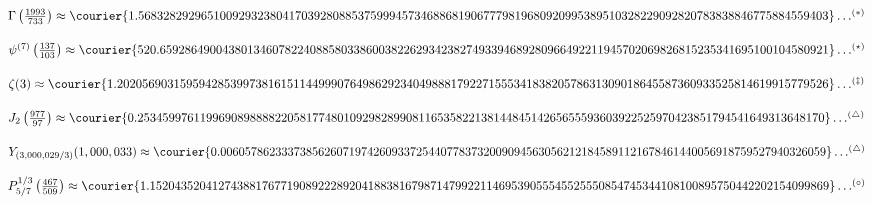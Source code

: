 \begin{flushleft}
\vspace{7.0pt} $\Gamma \left ( \frac{1993}{733} \right ) \approx
\mbox{\courier{1.56832829296510092932380417039280885375999457346886819067779819680920995389510328229092820783838846775884559403}}\dots^{\left ( \ast \right )}$

\vspace{7.0pt} $\psi^{(7)} \left ( \frac{137}{103} \right ) \approx
\mbox{\courier{520.65928649004380134607822408858033860038226293423827493394689280966492211945702069826815235341695100104580921}}\dots^{\left ( \star \right )}$

\vspace{7.0pt} $\zeta(3) \approx
\mbox{\courier{1.20205690315959428539973816151144999076498629234049888179227155534183820578631309018645587360933525814619915779526}}\dots^{\left ( \ddag \right )}$

\vspace{7.0pt} $J_{2} \left ( \frac{977}{97} \right ) \approx
\mbox{\courier{0.25345997611996908988882205817748010929828990811653582213814484514265655593603922525970423851794541649313648170}}\dots^{\left ( \triangle \right )}$

\vspace{7.0pt} $Y_{(3,000,029/3)} (1,000,033) \approx
\mbox{\courier{0.006057862333738562607197426093372544077837320090945630562121845891121678461440056918759527940326059}}\dots^{\left ( \triangle \right )}$

\vspace{7.0pt} $P_{5/7}^{1/3} \left ( \frac{467}{509} \right ) \approx
\mbox{\courier{1.1520435204127438817677190892228920418838167987147992211469539055545525550854745344108100895750442202154099869}}\dots^{\left ( \circ \right )}$

\normalfont

\vspace{0.9pc}

\centering\hspace{0.0cm}\begin{minipage}{30.5cm}

\begin{flushleft}



\end{flushleft}

\end{minipage}

\end{flushleft}
